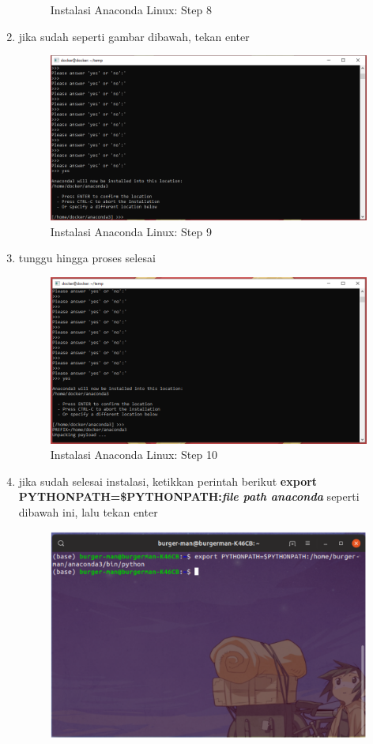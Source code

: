 \begin{enumerate}
\begin{figure}[H]
        \caption{Instalasi Anaconda Linux: Step 8}
\end{figure}
\item jika sudah seperti gambar dibawah, tekan enter
\begin{figure}[H]
        \centerline{\includegraphics[scale=0.5]{figures/instalasi-anaconda-linux/step9}}
        \caption{Instalasi Anaconda Linux: Step 9}
\end{figure}
\item tunggu hingga proses selesai
\begin{figure}[H]
        \centerline{\includegraphics[scale=0.5]{figures/instalasi-anaconda-linux/step10}}
        \caption{Instalasi Anaconda Linux: Step 10}
\end{figure}
\item jika sudah selesai instalasi, ketikkan perintah berikut \textbf{export PYTHONPATH=\$PYTHONPATH:\textit{file path anaconda}} seperti dibawah ini, lalu tekan enter
\begin{figure}[H]
        \centerline{\includegraphics[scale=0.5]{figures/instalasi-anaconda-linux/step11}}

\end{figure}
\end{enumerate}
